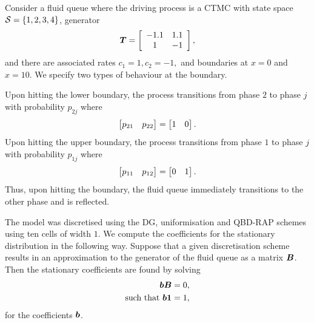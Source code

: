 

\begin{model}\label{model: simple}
	Consider a fluid queue where the driving process is a CTMC with state space \(\mathcal{S}=\{1,2,3,4\}\), generator 
	\[\boldsymbol T = \left[\begin{array}{cccc}
		-1.1 & 1.1 \\
		1 & -1 \\ 
	\end{array}\right],\]
	and there are associated rates \(c_1=1, c_2 = -1,\) and boundaries at \(x=0\) and \(x=10\). We specify two types of behaviour at the boundary.
	
	Upon hitting the lower boundary, the process transitions from phase \(2\) to phase \(j\) with probability \(p_{2j}\) where 
		\[\begin{bmatrix} p_{21} & p_{22}  \end{bmatrix} = \begin{bmatrix} 1 & 0 \end{bmatrix}.\]
		Upon hitting the upper boundary, the process transitions from phase \(1\) to phase \(j\) with probability \(p_{1j}\) where 
		\[\begin{bmatrix} p_{11} & p_{12}  \end{bmatrix} = \begin{bmatrix} 0 & 1 \end{bmatrix}.\]
	Thus, upon hitting the boundary, the fluid queue immediately transitions to the other phase and is reflected.
\end{model}

The model was discretised using the DG, uniformisation and QBD-RAP schemes using ten cells of width \(1\). We compute the coefficients for the stationary distribution in the following way. Suppose that a given discretisation scheme results in an approximation to the generator of the fluid queue as a matrix \(\boldsymbol B\). Then the stationary coefficients are found by solving 
\begin{align}
	\boldsymbol b \boldsymbol B = 0,\\
	\mbox{such that } \boldsymbol b\boldsymbol 1=1,
\end{align}
for the coefficients \(\boldsymbol b\). 

